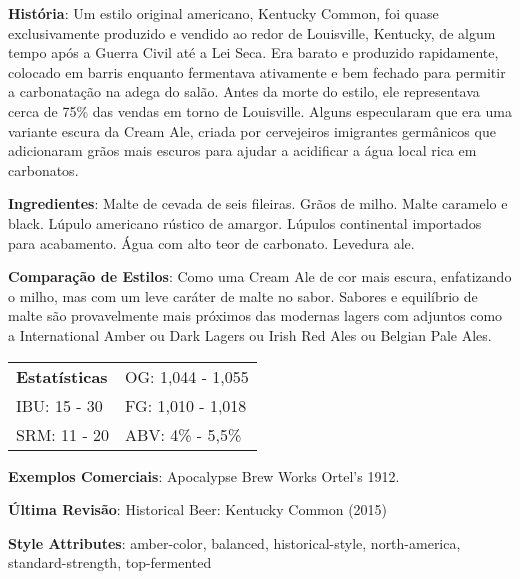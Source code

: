 \textbf{História}: Um estilo original americano, Kentucky Common, foi quase exclusivamente produzido e vendido ao redor de Louisville, Kentucky, de algum tempo após a Guerra Civil até a Lei Seca. Era barato e produzido rapidamente, colocado em barris enquanto fermentava ativamente e bem fechado para permitir a carbonatação na adega do salão. Antes da morte do estilo, ele representava cerca de 75\% das vendas em torno de Louisville. Alguns especularam que era uma variante escura da Cream Ale, criada por cervejeiros imigrantes germânicos que adicionaram grãos mais escuros para ajudar a acidificar a água local rica em carbonatos.

\textbf{Ingredientes}: Malte de cevada de seis fileiras. Grãos de milho. Malte caramelo e black. Lúpulo americano rústico de amargor. Lúpulos continental importados para acabamento. Água com alto teor de carbonato. Levedura ale.

\textbf{Comparação de Estilos}: Como uma Cream Ale de cor mais escura, enfatizando o milho, mas com um leve caráter de malte no sabor. Sabores e equilíbrio de malte são provavelmente mais próximos das modernas lagers com adjuntos como a International Amber ou Dark Lagers ou Irish Red Ales ou Belgian Pale Ales.

\begin{tabular}{@{}p{35mm}p{35mm}@{}}
  \textbf{Estatísticas} & OG: 1,044 - 1,055  \\
  IBU: 15 - 30  & FG: 1,010 - 1,018  \\
  SRM: 11 - 20 & ABV: 4\% - 5,5\%
\end{tabular}

\textbf{Exemplos Comerciais}: Apocalypse Brew Works Ortel's 1912.

\textbf{Última Revisão}: Historical Beer: Kentucky Common (2015)

\textbf{Style Attributes}: amber-color, balanced, historical-style, north-america, standard-strength, top-fermented
